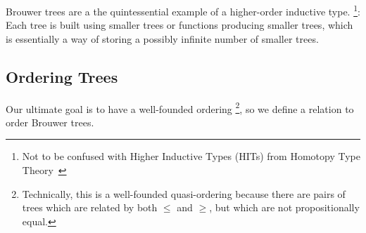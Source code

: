 Brouwer trees are a the quintessential example of a higher-order inductive type.%
\footnote{Not to be confused with Higher Inductive Types (HITs) from Homotopy Type Theory~\citep{hottbook}}:
Each tree is built using smaller trees or functions producing smaller trees, which is essentially
a way of storing a possibly infinite number of smaller trees.

\subsection{Ordering Trees}

Our ultimate goal is to have a well-founded ordering%
\footnote{Technically, this is a well-founded quasi-ordering because there are pairs of
  trees which are related by both $\leq$ and $\geq$, but which are not propositionally equal.},
so we define a relation to order Brouwer trees.


